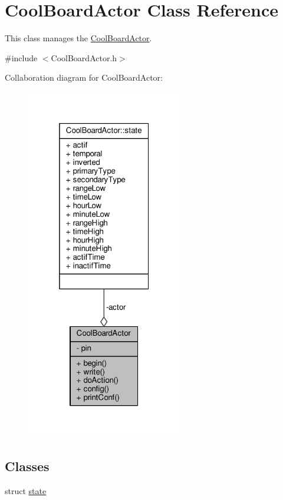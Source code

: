 \hypertarget{class_cool_board_actor}{}\section{Cool\+Board\+Actor Class Reference}
\label{class_cool_board_actor}


This class manages the \hyperlink{class_cool_board_actor}{Cool\+Board\+Actor}.  




{\ttfamily \#include $<$Cool\+Board\+Actor.\+h$>$}



Collaboration diagram for Cool\+Board\+Actor\+:
\nopagebreak
\begin{figure}[H]
\begin{center}
\leavevmode
\includegraphics[width=193pt]{d6/d3e/class_cool_board_actor__coll__graph}
\end{center}
\end{figure}
\subsection*{Classes}
\begin{DoxyCompactItemize}
\item 
struct \hyperlink{struct_cool_board_actor_1_1state}{state}
\end{DoxyCompactItemize}
